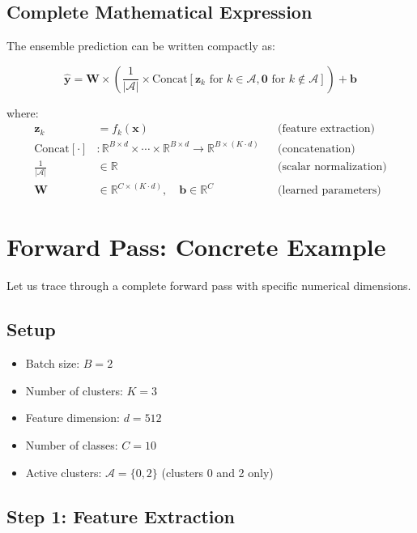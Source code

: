 \documentclass[11pt,a4paper]{article}
\newcommand{\R}{\mathbb{R}}
\begin{document}
\subsection{Complete Mathematical Expression}

The ensemble prediction can be written compactly as:

\begin{equation}
\hat{\mathbf{y}} = \mathbf{W} \times \left(\frac{1}{|\mathcal{A}|} \times \text{Concat}\left[\mathbf{z}_k \text{ for } k \in \mathcal{A}, \mathbf{0} \text{ for } k \notin \mathcal{A}\right]\right) + \mathbf{b}
\end{equation}

where:
\begin{align}
\mathbf{z}_k &= f_k(\mathbf{x}) && \text{(feature extraction)} \\
\text{Concat}[\cdot] &: \R^{B \times d} \times \cdots \times \R^{B \times d} \to \R^{B \times (K \cdot d)} && \text{(concatenation)} \\
\frac{1}{|\mathcal{A}|} &\in \R && \text{(scalar normalization)} \\
\mathbf{W} &\in \R^{C \times (K \cdot d)}, \quad \mathbf{b} \in \R^C && \text{(learned parameters)}
\end{align}

\section{Forward Pass: Concrete Example}

Let us trace through a complete forward pass with specific numerical dimensions.

\subsection{Setup}

\begin{itemize}
    \item Batch size: $B = 2$
    \item Number of clusters: $K = 3$
    \item Feature dimension: $d = 512$
    \item Number of classes: $C = 10$
    \item Active clusters: $\mathcal{A} = \{0, 2\}$ (clusters 0 and 2 only)
\end{itemize}

\subsection{Step 1: Feature Extraction}
\end{document}
